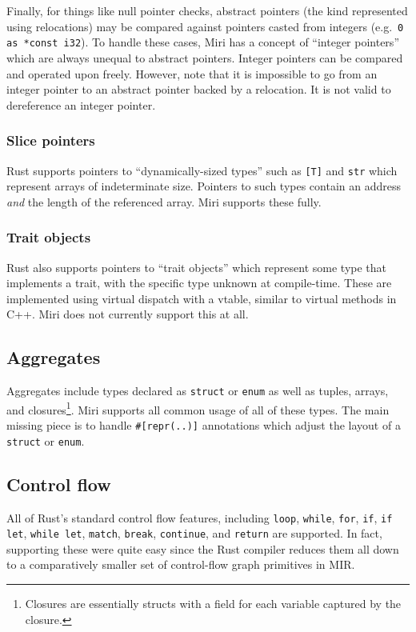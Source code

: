 \documentclass[twocolumn]{article}
\newcommand{\rust}[1]{\texttt{#1}}
\begin{document}
Finally, for things like null pointer checks, abstract pointers (the kind represented using
relocations) may be compared against pointers casted from integers (e.g.\ \rust{0 as *const i32}).
To handle these cases, Miri has a concept of ``integer pointers'' which are always unequal to
abstract pointers. Integer pointers can be compared and operated upon freely. However, note that it
is impossible to go from an integer pointer to an abstract pointer backed by a relocation. It is not
valid to dereference an integer pointer.

\subsubsection{Slice pointers}

Rust supports pointers to ``dynamically-sized types'' such as \rust{[T]} and \rust{str} which
represent arrays of indeterminate size. Pointers to such types contain an address \emph{and} the
length of the referenced array. Miri supports these fully.

\subsubsection{Trait objects}

Rust also supports pointers to ``trait objects'' which represent some type that implements a trait,
with the specific type unknown at compile-time. These are implemented using virtual dispatch with a
vtable, similar to virtual methods in C++. Miri does not currently support this at all.

\subsection{Aggregates}

Aggregates include types declared as \rust{struct} or \rust{enum} as well as tuples, arrays, and
closures\footnote{Closures are essentially structs with a field for each variable captured by the
closure.}. Miri supports all common usage of all of these types. The main missing piece is to handle
\texttt{\#[repr(..)]} annotations which adjust the layout of a \rust{struct} or \rust{enum}.

\subsection{Control flow}

All of Rust's standard control flow features, including \rust{loop}, \rust{while}, \rust{for},
\rust{if}, \rust{if let}, \rust{while let}, \rust{match}, \rust{break}, \rust{continue}, and
\rust{return} are supported. In fact, supporting these were quite easy since the Rust compiler
reduces them all down to a comparatively smaller set of control-flow graph primitives in MIR.
\end{document}

